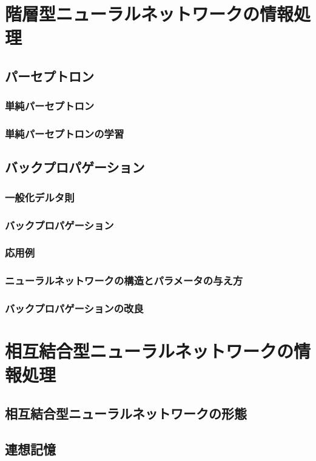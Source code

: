 \documentclass[uplatex, 11pt, a4j, dvipdfmx]{jsarticle}
\begin{document}
  \section{階層型ニューラルネットワークの情報処理}
    \subsection{パーセプトロン} %
      \subsubsection{単純パーセプトロン}
      \subsubsection{単純パーセプトロンの学習}
    \subsection{バックプロパゲーション}
      \subsubsection{一般化デルタ則}
      \subsubsection{バックプロパゲーション}
      \subsubsection{応用例} %
      \subsubsection{ニューラルネットワークの構造とパラメータの与え方} %
      \subsubsection{バックプロパゲーションの改良} %

  \section{相互結合型ニューラルネットワークの情報処理}
    \subsection{相互結合型ニューラルネットワークの形態}
    \subsection{連想記憶}
\end{document}
